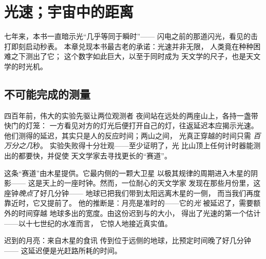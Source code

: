 \chapter{光速；宇宙中的距离}\label{ch:g8:speed-of-light}

七年来，本书一直暗示光“几乎等同于瞬时”——
闪电之前的那道闪光，看见的击打即刻启动秒表。
本章兑现本书最古老的承诺：光速并非无限，
人类竟在种种困难之下测出了它；
这个数字如此巨大，以至于同时成为
天文学的尺子，也是天文学的时光机。

\section{不可能完成的测量}

\begin{example}[两座山上的灯笼]\label{ex:g8:speed-of-light:galileo}
四百年前，伟大的实验先驱让两位观测者
夜间站在远处的两座山上，各持一盏带快门的灯笼：
一方看见对方的灯光后便打开自己的灯，往返延迟本应揭示光速。
他们测得的延迟，其实只是人的反应时间；两山之间，
光真正穿越的时间只需
\emph{百万分之几}秒。
实验失败得十分壮观——至少证明了，光
比山顶上任何计时器能测出的都要快，并促使
天文学家去寻找更长的“赛道”。
\end{example}

\begin{example}[迟到的月亮]\label{ex:g8:speed-of-light:romer}
这条“赛道”由木星提供。它最内侧的一颗大卫星
以极其规律的周期进入木星的阴影——
这是天上的一座时钟。然而，一位耐心的天文学家
发现在那些月份里，这座钟\emph{晚点}了好几分钟——
地球已把我们带到太阳远离木星的一侧，
而当我们再度靠近时，它又提前了。
他的推断是：月亮是准时的——它的\emph{光}
被延迟了，需要额外的时间穿越
地球多出的宽度。由这份迟到与的大小，
得出了光速的第一个估计——以十七世纪的水准而言，
它惊人地接近真实值。
\end{example}

\begin{omfigure}

{\small 迟到的月亮：来自木星的食讯
传到位于远侧的地球，比预定时间晚了好几分钟——
这延迟便是光赶路所耗的时间。}
\end{omfigure}

